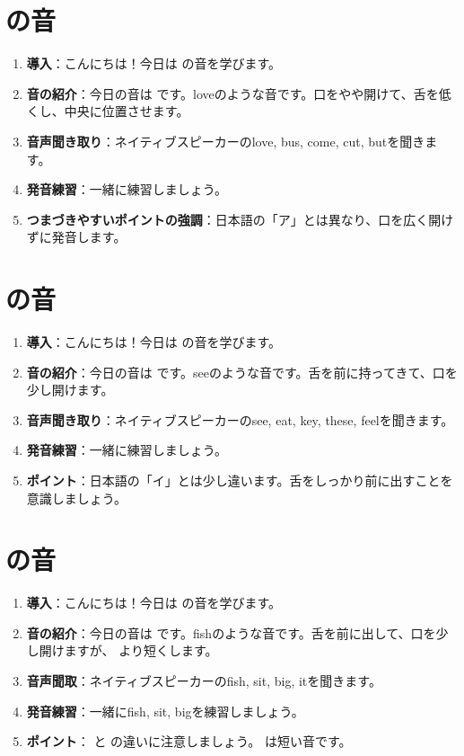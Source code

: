 \documentclass[book,jafontscale=0.9247]{jlreq}
\begin{document}
\section{\textipa{/\textturnv /} の音}
\begin{enumerate}
    \item \textbf{導入}：こんにちは！今日は \textipa{/\textturnv /} の音を学びます。
    \item \textbf{音の紹介}：今日の音は \textipa{/\textturnv /} です。loveのような音です。口をやや開けて、舌を低くし、中央に位置させます。
    \item \textbf{音声聞き取り}：ネイティブスピーカーのlove, bus, come, cut, butを聞きます。
    \item \textbf{発音練習}：一緒に練習しましょう。
    \item \textbf{つまづきやすいポイントの強調}：日本語の「ア」とは異なり、口を広く開けずに発音します。
\end{enumerate}
\newpage

\section{ の音}
\begin{enumerate}
    \item \textbf{導入}：こんにちは！今日は  の音を学びます。
    \item \textbf{音の紹介}：今日の音は  です。seeのような音です。舌を前に持ってきて、口を少し開けます。
    \item \textbf{音声聞き取り}：ネイティブスピーカーのsee, eat, key, these, feelを聞きます。
    \item \textbf{発音練習}：一緒に練習しましょう。
    \item \textbf{ポイント}：日本語の「イ」とは少し違います。舌をしっかり前に出すことを意識しましょう。
\end{enumerate}
\section{\textipa{/\textsci /} の音}
\begin{enumerate}
    \item \textbf{導入}：こんにちは！今日は \textipa{/\textsci /} の音を学びます。
    \item \textbf{音の紹介}：今日の音は \textipa{/\textsci /} です。fishのような音です。舌を前に出して、口を少し開けますが、 より短くします。
    \item \textbf{音声聞取}：ネイティブスピーカーのfish, sit, big, itを聞きます。
    \item \textbf{発音練習}：一緒にfish, sit, bigを練習しましょう。
    \item \textbf{ポイント}： と  の違いに注意しましょう。  は短い音です。
\end{enumerate}
\end{document}
